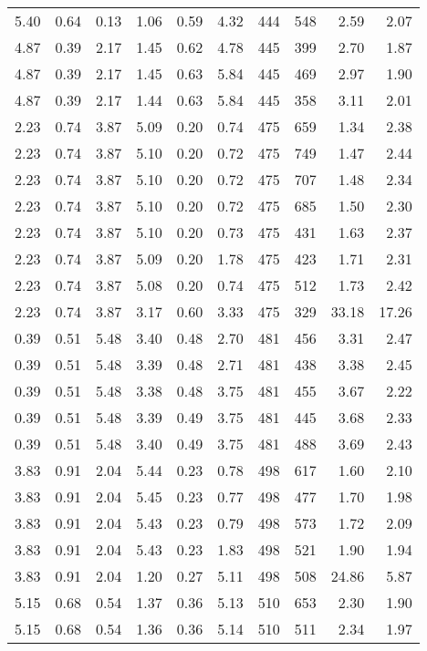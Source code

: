 \begin{longtable}{rrrrrrrrrr}
5.40	&	0.64	&	0.13	&	1.06	&	0.59	&	4.32	&	444	&	548	&	2.59	&	2.07	\\
4.87	&	0.39	&	2.17	&	1.45	&	0.62	&	4.78	&	445	&	399	&	2.70	&	1.87	\\
4.87	&	0.39	&	2.17	&	1.45	&	0.63	&	5.84	&	445	&	469	&	2.97	&	1.90	\\
4.87	&	0.39	&	2.17	&	1.44	&	0.63	&	5.84	&	445	&	358	&	3.11	&	2.01	\\
2.23	&	0.74	&	3.87	&	5.09	&	0.20	&	0.74	&	475	&	659	&	1.34	&	2.38	\\
2.23	&	0.74	&	3.87	&	5.10	&	0.20	&	0.72	&	475	&	749	&	1.47	&	2.44	\\
2.23	&	0.74	&	3.87	&	5.10	&	0.20	&	0.72	&	475	&	707	&	1.48	&	2.34	\\
2.23	&	0.74	&	3.87	&	5.10	&	0.20	&	0.72	&	475	&	685	&	1.50	&	2.30	\\
2.23	&	0.74	&	3.87	&	5.10	&	0.20	&	0.73	&	475	&	431	&	1.63	&	2.37	\\
2.23	&	0.74	&	3.87	&	5.09	&	0.20	&	1.78	&	475	&	423	&	1.71	&	2.31	\\
2.23	&	0.74	&	3.87	&	5.08	&	0.20	&	0.74	&	475	&	512	&	1.73	&	2.42	\\
2.23	&	0.74	&	3.87	&	3.17	&	0.60	&	3.33	&	475	&	329	&	33.18	&	17.26	\\
0.39	&	0.51	&	5.48	&	3.40	&	0.48	&	2.70	&	481	&	456	&	3.31	&	2.47	\\
0.39	&	0.51	&	5.48	&	3.39	&	0.48	&	2.71	&	481	&	438	&	3.38	&	2.45	\\
0.39	&	0.51	&	5.48	&	3.38	&	0.48	&	3.75	&	481	&	455	&	3.67	&	2.22	\\
0.39	&	0.51	&	5.48	&	3.39	&	0.49	&	3.75	&	481	&	445	&	3.68	&	2.33	\\
0.39	&	0.51	&	5.48	&	3.40	&	0.49	&	3.75	&	481	&	488	&	3.69	&	2.43	\\
3.83	&	0.91	&	2.04	&	5.44	&	0.23	&	0.78	&	498	&	617	&	1.60	&	2.10	\\
3.83	&	0.91	&	2.04	&	5.45	&	0.23	&	0.77	&	498	&	477	&	1.70	&	1.98	\\
3.83	&	0.91	&	2.04	&	5.43	&	0.23	&	0.79	&	498	&	573	&	1.72	&	2.09	\\
3.83	&	0.91	&	2.04	&	5.43	&	0.23	&	1.83	&	498	&	521	&	1.90	&	1.94	\\
3.83	&	0.91	&	2.04	&	1.20	&	0.27	&	5.11	&	498	&	508	&	24.86	&	5.87	\\
5.15	&	0.68	&	0.54	&	1.37	&	0.36	&	5.13	&	510	&	653	&	2.30	&	1.90	\\
5.15	&	0.68	&	0.54	&	1.36	&	0.36	&	5.14	&	510	&	511	&	2.34	&	1.97	\\

\end{longtable}
